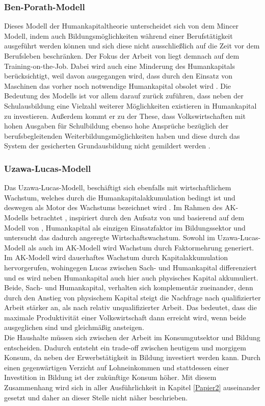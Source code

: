 \subsubsection*{Ben-Porath-Modell}
Dieses Modell der Humankapitaltheorie unterscheidet sich von dem Mincer Modell, indem auch Bildungsmöglichkeiten während einer Berufstätigkeit ausgeführt werden können und sich diese nicht ausschließlich auf die Zeit vor dem Berufsleben beschränken. Der Fokus der Arbeit von \cite{BenPorath.1967} liegt demnach auf dem Training-on-the-Job. Dabei wird auch eine Minderung des Humankapitals berücksichtigt, weil  davon ausgegangen wird, dass durch den Einsatz von Maschinen das vorher noch notwendige Humankapital obsolet wird \cite{BenPorath.1967,Heckman.1998,Guvenen.2012,Manuelli.2014}. Die Bedeutung des Modells ist vor allem darauf zurück zuführen, dass neben der Schulausbildung eine Vielzahl weiterer Möglichkeiten existieren in Humankapital zu investieren. Außerdem kommt er zu der These, dass Volkswirtschaften mit hohen Ausgaben für Schulbildung ebenso hohe Ansprüche bezüglich der berufsbegleitenden Weiterbildungsmöglichkeiten haben und diese durch das System der gesicherten Grundausbildung nicht gemildert werden \cite{BenPorath.1967}.
%
\subsubsection*{Uzawa-Lucas-Modell}
Das Uzawa-Lucas-Modell, beschäftigt sich ebenfalls mit wirtschaftlichem Wachstum, welches durch die Humankapitalakkumulation bedingt ist und deswegen als Motor des Wachstums bezeichnet wird \cite{Lucas.1988}. Im Rahmen des AK-Modells \cite{Rebelo.1991} betrachtet \cite{Lucas.1988}, inspiriert durch den Aufsatz von \cite{Becker.1964} und basierend auf dem Modell von \cite{Uzawa.1965}, Humankapital als einzigen Einsatzfaktor im Bildungssektor und untersucht das dadurch angeregte Wirtschaftswachstum. Sowohl im Uzawa-Lucas-Modell als auch im AK-Modell wird Wachstum durch Faktormehrung generiert. Im AK-Modell wird dauerhaftes Wachstum durch Kapitalakkumulation hervorgerufen, wohingegen Lucas zwischen Sach- und Humankapital differenziert und es wird neben Humankapital auch hier auch physisches Kapital akkumuliert. Beide, Sach- und Humankapital, verhalten sich komplementär zueinander, denn durch den Anstieg von physischem Kapital steigt die Nachfrage nach qualifizierter Arbeit stärker an, als nach relativ unqualifizierter Arbeit. Das bedeutet, dass die maximale Produktivität einer Volkswirtschaft dann erreicht wird, wenn beide ausgeglichen sind und gleichmäßig ansteigen.\\
%
Die Haushalte müssen sich zwischen der Arbeit im Konsumgutsektor und Bildung entscheiden. Dadurch entsteht ein trade-off zwischen heutigem und morgigem Konsum, da neben der Erwerbstätigkeit in Bildung investiert werden kann. Durch einen gegenwärtigen Verzicht auf Lohneinkommen und stattdessen einer Investition in Bildung ist der zukünftige Konsum höher. Mit diesem Zusammenhang wird sich in aller Ausführlichkeit in Kapitel \ref{Papier2} auseinander gesetzt und daher an dieser Stelle nicht näher beschrieben.
%
